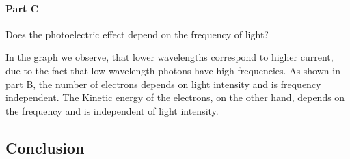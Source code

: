 \documentclass{article}
\begin{document}
\paragraph{Part C}  Does the photoelectric effect depend on the frequency of light?

In the graph we observe, that lower wavelengths correspond to higher current, due to the fact that low-wavelength photons have high frequencies. As shown in part B, the number of electrons depends on light intensity and is frequency independent. The Kinetic energy of the electrons, on the other hand, depends on the frequency and is independent of light intensity.




\newpage
\subsection{Conclusion}
\paragraph{}




\newpage








\printbibliography






 
 
\end{document}
